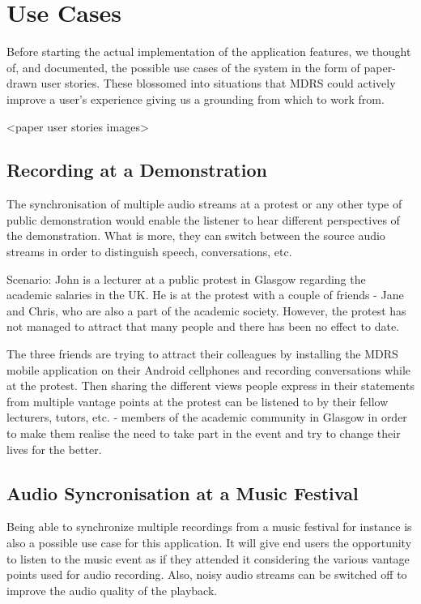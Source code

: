 \documentclass{l3proj}
\begin{document}
\section{Use Cases}
Before starting the actual implementation of the application features, we thought of, and documented, the possible use cases of the system in the form of paper-drawn user stories. These blossomed into situations that MDRS could actively improve a user's experience giving us a grounding from which to work from.

<paper user stories images>

\subsection{Recording at a Demonstration} The synchronisation of multiple audio streams at a protest or any other type of public demonstration would enable the listener to hear different perspectives of the demonstration. What is more, they can switch between the source audio streams in order to distinguish speech, conversations, etc.

Scenario: John is a lecturer at a public protest in Glasgow regarding the academic salaries in the UK. He is at the protest with a couple of friends - Jane and Chris, who are also a part of the academic society. However, the protest has not managed to attract that many people and there has been no effect to date.

The three friends are trying to attract their colleagues by installing the MDRS mobile application on their Android cellphones and recording conversations while at the protest. Then sharing the different views people express in their statements from multiple vantage points at the protest can be listened to by their fellow lecturers, tutors, etc. - members of the academic community in Glasgow in order to make them realise the need to take part in the event and try to change their lives for the better.

\subsection{Audio Syncronisation at a Music Festival} Being able to synchronize multiple recordings from a music festival for instance is also a possible use case for this application. It will give end users the opportunity to listen to the music event as if they attended it considering the various vantage points used for audio recording. Also, noisy audio streams can be switched off to improve the audio quality of the playback.
\end{document}
